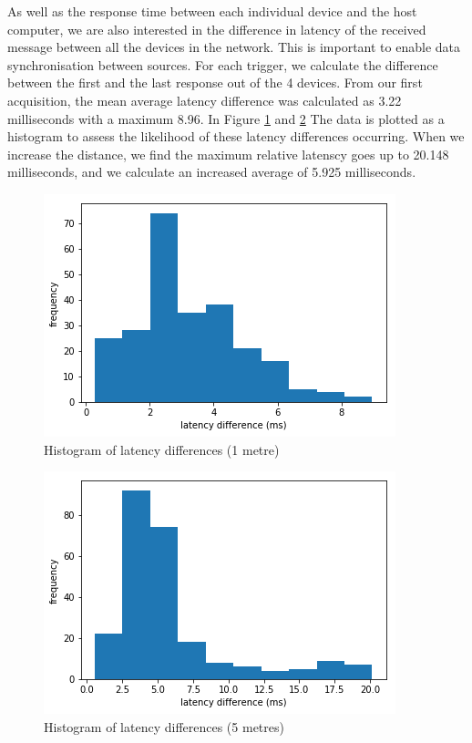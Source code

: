 As well as the response time between each individual device and the host computer, we are also interested in the difference in latency of the received message between all the devices in the network. This is important to enable data synchronisation between sources. For each trigger, we calculate the difference between the first and the last response out of the 4 devices. From our first acquisition, the mean average latency difference was calculated as 3.22 milliseconds with a maximum 8.96. In Figure \ref{fig:latency_fig6} and \ref{fig:latency_fig7} The data is plotted as a histogram to assess the likelihood of these latency differences occurring. When we increase the distance, we find the maximum relative latenscy goes up to 20.148 milliseconds, and we calculate an increased average of 5.925 milliseconds.

\begin{figure}[ht]
  \centering
    \includegraphics[width=\textwidth]{Chapters/Figures/technical/Latency/figure6.png}
    \caption{Histogram of latency differences (1 metre)}
    \label{fig:latency_fig6}
\end{figure}

\begin{figure}[ht]
  \centering
    \includegraphics[width=\textwidth]{Chapters/Figures/technical/Latency/figure7.png}
    \caption{Histogram of latency differences (5 metres)}
    \label{fig:latency_fig7}
\end{figure}

